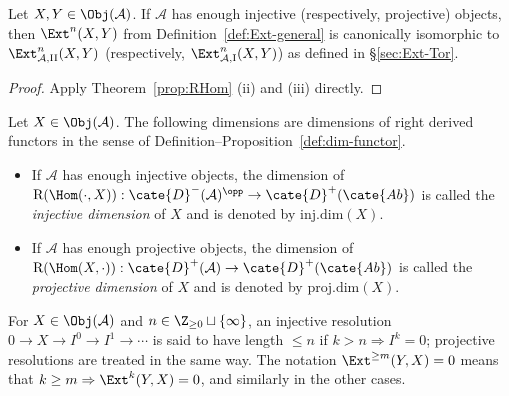 \begin{corollary}\label{prop:Ext-reconcilation}
	Let $X,Y\in\Obj(\mathcal{A})$. If $\mathcal{A}$ has enough injective
	(respectively, projective) objects, then $\Ext^n(X,Y)$ from
	Definition~\ref{def:Ext-general} is canonically isomorphic to
	$\Ext^n_{\mathcal{A},\mathrm{II}}(X,Y)$ (respectively,
	$\Ext^n_{\mathcal{A},\mathrm{I}}(X,Y)$) as defined in
	\S\ref{sec:Ext-Tor}.
\end{corollary}
\begin{proof}
	Apply Theorem~\ref{prop:RHom} (ii) and (iii) directly.
\end{proof}

\begin{definition}
	Let $X\in\Obj(\mathcal{A})$. The following dimensions are dimensions of
	right derived functors in the sense of
	Definition--Proposition~\ref{def:dim-functor}.
	\begin{itemize}
		\item If $\mathcal{A}$ has enough injective objects, the dimension of
		$\mathrm{R}(\Hom(\cdot,X)):
		\cate{D}^-(\mathcal{A})^{\opp}\to\cate{D}^+(\cate{Ab})$ is called the
		\emph{injective dimension} of $X$ and is denoted by
		$\mathrm{inj.dim}(X)$.
		\item If $\mathcal{A}$ has enough projective objects, the dimension of
		$\mathrm{R}(\Hom(X,\cdot)):
		\cate{D}^+(\mathcal{A})\to\cate{D}^+(\cate{Ab})$ is called the
		\emph{projective dimension} of $X$ and is denoted by
		$\mathrm{proj.dim}(X)$.
	\end{itemize}
\end{definition}

For $X\in\Obj(\mathcal{A})$ and
$n\in\Z_{\geq0}\sqcup\{\infty\}$, an injective resolution
$0\to X\to I^0\to I^1\to\cdots$ is said to have length $\leq n$ if
$k>n\Rightarrow I^k=0$; projective resolutions are treated in the same way.
The notation $\Ext^{\geq m}(Y,X)=0$ means that
$k\geq m\Rightarrow\Ext^k(Y,X)=0$, and similarly in the other cases.

